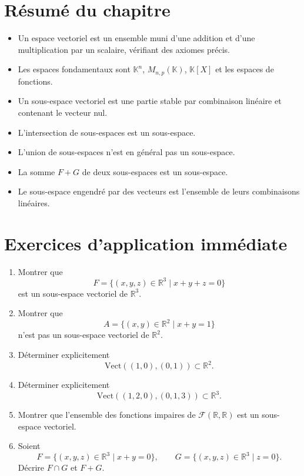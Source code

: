 \documentclass[11pt,a4paper]{article}
\theoremstyle{remark}
\newcommand{\R}{\mathbb{R}}
\newcommand{\K}{\mathbb{K}}
\begin{document}
\section{Résumé du chapitre}

\begin{itemize}
    \item Un espace vectoriel est un ensemble muni d’une addition et d’une multiplication par un scalaire, vérifiant des axiomes précis.
    \item Les espaces fondamentaux sont \(\K^n\), \(M_{n,p}(\K)\), \(\K[X]\) et les espaces de fonctions.
    \item Un sous-espace vectoriel est une partie stable par combinaison linéaire et contenant le vecteur nul.
    \item L’intersection de sous-espaces est un sous-espace.
    \item L’union de sous-espaces n’est en général pas un sous-espace.
    \item La somme \(F+G\) de deux sous-espaces est un sous-espace.
    \item Le sous-espace engendré par des vecteurs est l’ensemble de leurs combinaisons linéaires.
\end{itemize}

\section*{Exercices d’application immédiate}

\begin{enumerate}[label=\textbf{Exercice \arabic*.}]
    \item Montrer que
    \[
    F=\{(x,y,z)\in\R^3\mid x+y+z=0\}
    \]
    est un sous-espace vectoriel de \(\R^3\).

    \item Montrer que
    \[
    A=\{(x,y)\in\R^2\mid x+y=1\}
    \]
    n’est pas un sous-espace vectoriel de \(\R^2\).

    \item Déterminer explicitement
    \[
    \mathrm{Vect}((1,0),(0,1)) \subset \R^2.
    \]

    \item Déterminer explicitement
    \[
    \mathrm{Vect}((1,2,0),(0,1,3)) \subset \R^3.
    \]

    \item Montrer que l’ensemble des fonctions impaires de \(\mathcal{F}(\R,\R)\) est un sous-espace vectoriel.

    \item Soient
    \[
    F=\{(x,y,z)\in\R^3\mid x+y=0\},
    \qquad
    G=\{(x,y,z)\in\R^3\mid z=0\}.
    \]
    Décrire \(F\cap G\) et \(F+G\).
\end{enumerate}
\end{document}
